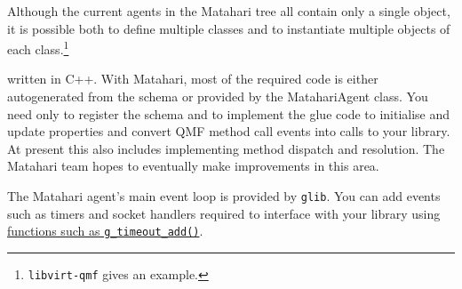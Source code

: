 Although the current agents in the Matahari tree all contain only a single object, it is possible both to define multiple classes and to instantiate multiple objects of each class.\footnote{\texttt{libvirt-qmf} gives an example.}

 written in C++. With Matahari, most of the required code is either autogenerated from the schema or provided by the MatahariAgent class. You need only to register the schema and to implement the glue code to initialise and update properties and convert QMF method call events into calls to your library.
At present this also includes implementing method dispatch and resolution. The Matahari team hopes to eventually make improvements in this area.

The Matahari agent's main event loop is provided by \texttt{glib}. You can add events such as timers and socket handlers required to interface with your library using \href{http://developer.gnome.org/glib/2.29/glib-The-Main-Event-Loop.html}{functions such as \texttt{g\_timeout\_add()}}.

